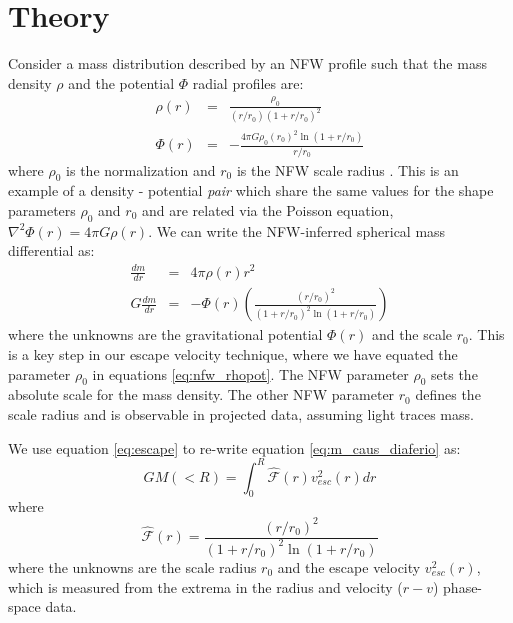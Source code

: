 \documentclass[iop]{emulateapj}
\begin{document}
    
\section{Theory}
\label{sec:theory}

        Consider a mass distribution described by an NFW profile such that the mass density $\rho$ and the potential $\Phi$ radial profiles are:
        \begin{eqnarray}
        \rho(r) &=& \frac{\rho_0}{(r/r_0)(1+r/r_0)^2} \nonumber \\ 
        \Phi(r) &=& -\frac{4\pi G \rho_0 (r_0)^2 \ln(1+r/r_0)}{r/r_0}
        \label{eq:nfw_rhopot}
        \end{eqnarray}
        where $\rho_0$ is the normalization and $r_0$ is the NFW scale radius \citep{NFW97}. This is an example of a density - potential \emph{pair} which share the same values for the shape parameters $\rho_0$ and $r_0$ and are related via the Poisson equation, $\nabla^2\Phi(r) = 4 \pi G \rho (r)$. We can write the NFW-inferred spherical mass differential as: 
      \begin{eqnarray}
        \frac{dm}{dr} &=& 4\pi\rho (r) r^2  \nonumber \\
        G\frac{dm}{dr} &=& -\Phi(r) \left (\frac{(r/r_0)^2}{(1+r/r_0)^2 \ln(1+r/r_0)} \right )
        \label{eq:m_caus_diaferio}
        \end{eqnarray}
         where the unknowns are the gravitational potential $\Phi (r)$ and the scale $r_0$. This is a key step in our escape velocity technique, where we have equated the parameter $\rho_0$ in equations \ref{eq:nfw_rhopot}. The NFW parameter $\rho_0$ sets the absolute scale for the mass density. The other NFW parameter $r_0$ defines the scale radius and is observable in projected data, assuming light traces mass.
        
        We use equation \ref{eq:escape} to re-write equation \ref{eq:m_caus_diaferio} as:
        \begin{equation}
        G M(<R) = \int_0^R \hat{\mathcal{F}}(r) v^2_{esc}(r) dr 
        \label{eq:m_caustic_nfw}
        \end{equation}
        where 
        \begin{equation}
        \hat{\mathcal{F}}(r) =\frac{(r/r_0)^2}{(1+r/r_0)^2 \ln(1+r/r_0)} 
        \label{eq:F_r_nfw}
        \end{equation}
where the unknowns are the scale radius $r_0$ and the escape velocity $v^2_{esc}(r)$,  which is measured from the extrema in the radius and velocity ($r-v$) phase-space data. 
\end{document}
